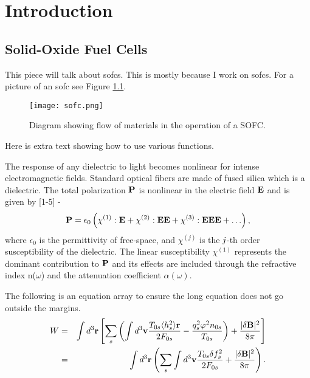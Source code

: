 


\chapter{Introduction}

\section{Solid-Oxide Fuel Cells}

This piece will talk about \glspl{sofc}. This is mostly because I work on \glspl{sofc}. %
For a picture of an \gls{sofc} see Figure \ref{image:sofc}.
\begin{figure}[h]
  \centering
  \texttt{[image: sofc.png]}
  \caption{Diagram showing flow of materials in the operation of a SOFC.\cite{Sakurambo}}
  \label{image:sofc}
\end{figure}

Here is extra text showing how to use various functions.

The response of any dielectric to light becomes nonlinear
for intense electromagnetic fields.  Standard optical fibers are made of
fused silica which is a dielectric. The total polarization $\bf{P}$
is nonlinear in the electric field $\bf{E}$ and is given by [1-5] -
\begin{equation}
{\bf P} = \epsilon_{0} \left( \chi^{(1)} : {\bf E} + \chi^{(2)}
: {\bf EE} + \chi^{(3)} : {\bf EEE} + \ldots \right),
\end{equation}
where $\epsilon_0$ is the permittivity of free-space, and
$\chi^{(j)}$
is the ${\it j}$-th order susceptibility of the dielectric. The linear
susceptibility $\chi^{(1)}$ represents the dominant contribution to
$\bf{P}$ and its effects are included through the refractive index
n($\omega$) and the attenuation coefficient $\alpha(\omega)$.

The following is an equation array to ensure the long equation does not go outside the margins.
\begin{eqnarray}
W & = & \int d^3{\bf r} \left[ \sum_s \left( \int d^3{\bf v} {T_{0s} \langle h^2_s \rangle {\bf r} \over 2F_{0s}} - {q^2_s\varphi^2 n_{0s} \over T_{0s}} \right) + {|\delta {\bf B}|^2 \over 8 \pi} \right] \nonumber \\
& = & \int d^3{\bf r} \left( \sum_s \int d^3{\bf v} {T_{0s}\delta f^2_s \over 2F_{0s}} + {|\delta {\bf B}|^2 \over 8\pi} \right) .
\end{eqnarray}


